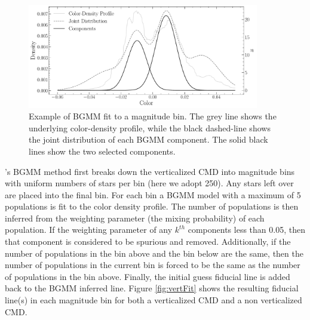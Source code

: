 \begin{figure}
	\centering
	\includegraphics[width=0.9\textwidth]{BGMMMixingBin.pdf}
	\caption{Example of BGMM fit to a magnitude bin. The grey line shows the
	underlying color-density profile, while the black dashed-line shows the
	joint distribution of each BGMM component. The solid black lines show the
	two selected components.}
	\label{fig:BGMMDist}
\end{figure}

\fidanka's BGMM method first breaks down the verticalized CMD into magnitude
bins with uniform numbers of stars per bin (here we adopt 250). Any stars left
over are placed into the final bin. For each bin a BGMM model with a maximum of
5 populations is fit to the color density profile. The number of populations is
then inferred from the weighting parameter (the mixing probability) of each
population. If the weighting parameter of any $k^{th}$ components less than
{\color{blue}0.05}, then that component is considered to be spurious and
removed. Additionally, if the number of populations in the bin above and the
bin below are the same, then the number of populations in the current bin is
forced to be the same as the number of populations in the bin above. Finally,
the initial guess fiducial line is added back to the BGMM inferred line. Figure
\ref{fig:vertFit} shows the resulting fiducial line(s) in each magnitude bin
for both a verticalized CMD and a non verticalized CMD.

